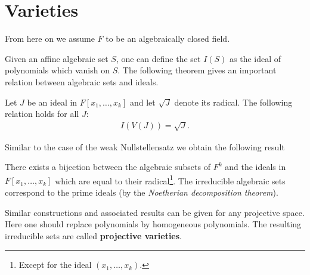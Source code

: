 \section{Varieties}

	From here on we assume $F$ to be an algebraically closed field.


	Given an affine algebraic set $S$, one can define the set $I(S)$ as the ideal of polynomials which vanish on $S$. The following theorem gives an important relation between algebraic sets and ideals.
	\begin{theorem}
		Let $J$ be an ideal in $F[x_1, \ldots, x_k]$ and let $\sqrt{J}$ denote its radical. The following relation holds for all $J$:
		\begin{gather}
			I(V(J)) = \sqrt{J}.
		\end{gather}
	\end{theorem}
	Similar to the case of the weak Nullstellensatz we obtain the following result
	\begin{result}
		There exists a bijection between the algebraic subsets of $F^k$ and the ideals in $F[x_1, \ldots, x_k]$ which are equal to their radical\footnote{Except for the ideal $(x_1, \ldots, x_k)$.}. The irreducible algebraic sets correspond to the prime ideals (by the \textit{Noetherian decomposition theorem}).
	\end{result}

	\begin{remark}
		Similar constructions and associated results can be given for any projective space. Here one should replace polynomials by homogeneous polynomials. The resulting irreducible sets are called \textbf{projective varieties}.
	\end{remark}

